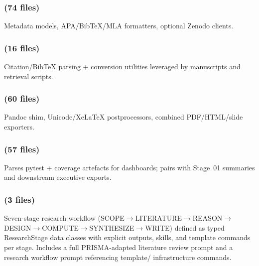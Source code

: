\documentclass[
  english,
]{article}
\begin{document}
\subsubsection{\texorpdfstring{ (74
files)}{infrastructure.publishing (74 files)}}\label{infrastructure.publishing-74-files}

Metadata models, APA/BibTeX/MLA formatters, optional Zenodo clients.

\subsubsection{\texorpdfstring{ (16
files)}{infrastructure.reference (16 files)}}\label{infrastructure.reference-16-files}

Citation/BibTeX parsing + conversion utilities leveraged by manuscripts
and retrieval scripts.

\subsubsection{\texorpdfstring{ (60
files)}{infrastructure.rendering (60 files)}}\label{infrastructure.rendering-60-files}

Pandoc shim, Unicode/XeLaTeX postprocessors, combined PDF/HTML/slide
exporters.

\subsubsection{\texorpdfstring{ (57
files)}{infrastructure.reporting (57 files)}}\label{infrastructure.reporting-57-files}

Parses pytest + coverage artefacts for dashboards; pairs with Stage~01
summaries and downstream executive exports.

\subsubsection{\texorpdfstring{ (3
files)}{infrastructure.research (3 files)}}\label{infrastructure.research-3-files}

Seven-stage research workflow
(SCOPE\texorpdfstring{\ensuremath{\to}}{->}LITERATURE\texorpdfstring{\ensuremath{\to}}{->}REASON\texorpdfstring{\ensuremath{\to}}{->}DESIGN\texorpdfstring{\ensuremath{\to}}{->}COMPUTE\texorpdfstring{\ensuremath{\to}}{->}SYNTHESIZE\texorpdfstring{\ensuremath{\to}}{->}WRITE) defined as
typed ResearchStage data classes with explicit outputs, skills, and
template commands per stage. Includes a full PRISMA-adapted literature
review prompt and a research workflow prompt referencing template/
infrastructure commands.
\end{document}
